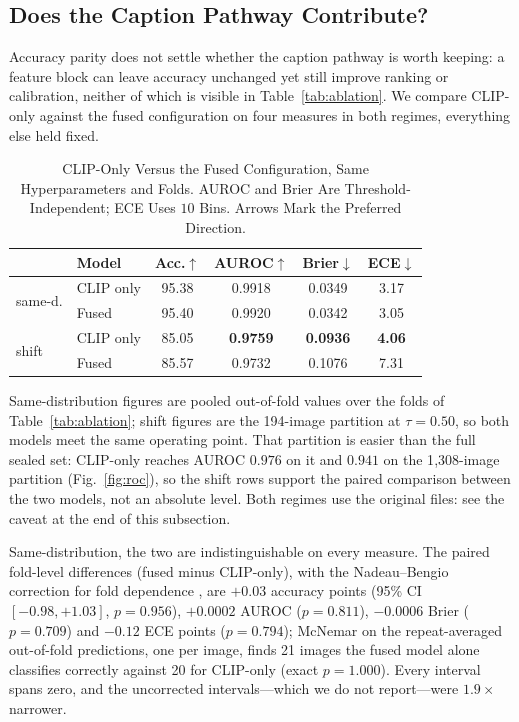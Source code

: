 \documentclass[pdflatex,sn-mathphys-num]{sn-jnl}
\begin{document}
\subsection{Does the Caption Pathway Contribute?}
\label{sec:fusion}

Accuracy parity does not settle whether the caption pathway is worth keeping: a
feature block can leave accuracy unchanged yet still improve ranking or
calibration, neither of which is visible in Table~\ref{tab:ablation}. We
compare CLIP-only against the fused configuration on four measures in both
regimes, everything else held fixed.

\begin{table}[!tb]
\caption{CLIP-Only Versus the Fused Configuration, Same Hyperparameters and
Folds. AUROC and Brier Are Threshold-Independent; ECE Uses $10$ Bins. Arrows
Mark the Preferred Direction.}
\label{tab:fusion}
\centering
\setlength{\tabcolsep}{4pt}
\footnotesize
\begin{tabular}{llcccc}
\toprule
& \textbf{Model} & \textbf{Acc.}$\uparrow$ & \textbf{AUROC}$\uparrow$ &
\textbf{Brier}$\downarrow$ & \textbf{ECE}$\downarrow$ \\
\midrule
\multirow{2}{*}{same-d.}
& CLIP only & 95.38 & 0.9918 & 0.0349 & 3.17 \\
& Fused     & 95.40 & 0.9920 & 0.0342 & 3.05 \\
\midrule
\multirow{2}{*}{shift}
& CLIP only & 85.05 & \textbf{0.9759} & \textbf{0.0936} & \textbf{4.06} \\
& Fused     & 85.57 & 0.9732 & 0.1076 & 7.31 \\
\bottomrule
\end{tabular}
\par\smallskip\parbox{\linewidth}{\footnotesize \footnotesize Same-distribution figures
are pooled out-of-fold values over the folds of Table~\ref{tab:ablation};
shift figures are the 194-image partition at $\tau = 0.50$, so both models meet
the same operating point. That partition is easier than the full sealed set:
CLIP-only reaches AUROC $0.976$ on it and $0.941$ on the 1{,}308-image partition
(Fig.~\ref{fig:roc}), so the shift rows support the paired comparison between the
two models, not an absolute level. Both regimes use the original files: see the
caveat at the end of this subsection.}
\end{table}

Same-distribution, the two are indistinguishable on every measure. The paired
fold-level differences (fused minus CLIP-only), with the Nadeau--Bengio
correction for fold dependence \cite{nadeau}, are $+0.03$ accuracy points
(95\% CI $[-0.98, +1.03]$, $p = 0.956$), $+0.0002$ AUROC ($p = 0.811$),
$-0.0006$ Brier ($p = 0.709$) and $-0.12$ ECE points ($p = 0.794$); McNemar on
the repeat-averaged out-of-fold predictions, one per image, finds 21 images the
fused model alone classifies correctly against 20 for CLIP-only (exact
$p = 1.000$). Every interval spans zero, and the uncorrected intervals---which
we do not report---were $1.9\times$ narrower.
\end{document}
